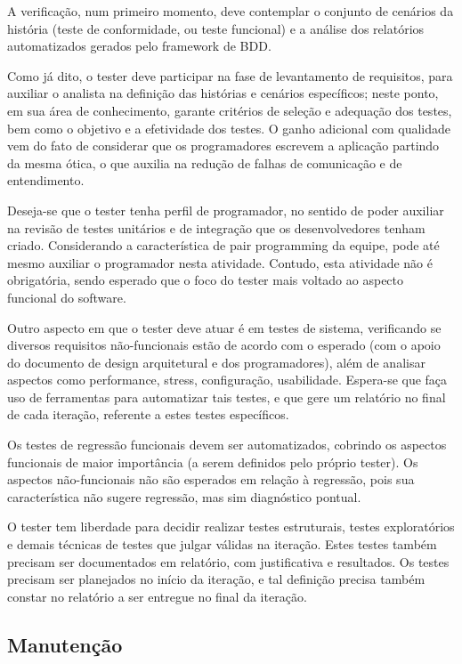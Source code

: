 \documentclass[12pt,journal,compsoc]{IEEEtran}
\begin{document}
A verificação, num primeiro momento, deve contemplar o conjunto de cenários da história (teste de conformidade, ou teste funcional) e a análise dos relatórios automatizados gerados pelo framework de BDD.

Como já dito, o tester deve participar na fase de levantamento de requisitos, para auxiliar o analista na definição das histórias e cenários específicos; neste ponto, em sua área de conhecimento, garante critérios de seleção e adequação dos testes, bem como o objetivo e a efetividade dos testes. O ganho adicional com qualidade vem do fato de considerar que os programadores escrevem a aplicação partindo da mesma ótica, o que auxilia na redução de falhas de comunicação e de entendimento.

Deseja-se que o tester tenha perfil de programador, no sentido de poder auxiliar na revisão de testes unitários e de integração que os desenvolvedores tenham criado. Considerando a característica de pair programming da equipe, pode até mesmo auxiliar o programador nesta atividade. Contudo, esta atividade não é obrigatória, sendo esperado que o foco do tester mais voltado ao aspecto funcional do software. 

Outro aspecto em que o tester deve atuar é em testes de sistema, verificando se diversos requisitos não-funcionais estão de acordo com o esperado (com o apoio do documento de design arquitetural e dos programadores), além de analisar aspectos como performance, stress, configuração, usabilidade. Espera-se que faça uso de  ferramentas para automatizar tais testes, e que gere um relatório no final de cada iteração, referente a estes testes específicos.

Os testes de regressão funcionais devem ser automatizados, cobrindo os aspectos funcionais de maior importância (a serem definidos pelo próprio tester). Os aspectos não-funcionais não são esperados em relação à regressão, pois sua característica não sugere regressão, mas sim diagnóstico pontual.

O tester tem liberdade para decidir realizar testes estruturais, testes exploratórios e demais técnicas de testes que julgar válidas na iteração. Estes testes também precisam ser documentados em relatório, com justificativa e resultados. Os testes precisam ser planejados no início da iteração, e tal definição precisa também constar no relatório a ser entregue no final da iteração.


\subsection{Manutenção}
\end{document}
